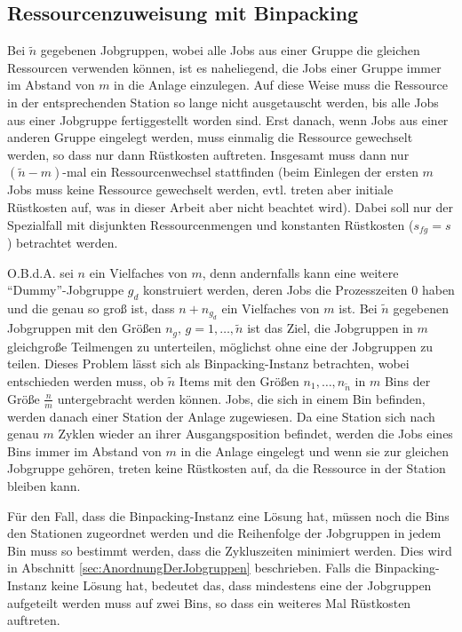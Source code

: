 \documentclass{scrreprt}
\begin{document}

\subsection{Ressourcenzuweisung mit Binpacking}
\label{subsec:RessourcenzuweisungMitBinpacking}
Bei $\tilde{n}$ gegebenen Jobgruppen, wobei alle Jobs aus einer Gruppe die gleichen Ressourcen verwenden können,
ist es naheliegend, die Jobs einer Gruppe immer im Abstand von $m$ in die Anlage einzulegen.
Auf diese Weise muss die Ressource in der entsprechenden Station so lange nicht ausgetauscht werden,
bis alle Jobs aus einer Jobgruppe fertiggestellt worden sind.
Erst danach, wenn Jobs aus einer anderen Gruppe eingelegt werden, muss einmalig die Ressource gewechselt werden,
so dass nur dann Rüstkosten auftreten.
Insgesamt muss dann nur $(\tilde{n}-m)$-mal ein Ressourcenwechsel stattfinden 
(beim Einlegen der ersten $m$ Jobs muss keine Ressource gewechselt werden, evtl. treten aber initiale Rüstkosten auf, was in dieser Arbeit aber nicht beachtet wird).
Dabei soll nur der Spezialfall mit disjunkten Ressourcenmengen und konstanten Rüstkosten ($s_{fg}=s$) betrachtet werden.

O.B.d.A. sei $n$ ein Vielfaches von $m$, denn andernfalls kann eine weitere "`Dummy"'-Jobgruppe $g_d$ konstruiert werden,
deren Jobs die Prozesszeiten $0$ haben und die genau so groß ist, dass $n+n_{g_d}$ ein Vielfaches von $m$ ist.
Bei $\tilde{n}$ gegebenen Jobgruppen mit den Größen $n_g, \, g=1,\ldots,\tilde{n}$ ist das Ziel,
die Jobgruppen in $m$ gleichgroße Teilmengen zu unterteilen, möglichst ohne eine der Jobgruppen zu teilen.
Dieses Problem lässt sich als Binpacking-Instanz betrachten, wobei entschieden werden muss, ob $\tilde{n}$ Items 
mit den Größen $n_1,\ldots,n_{\tilde{n}}$ in $m$ Bins der Größe $\frac{n}{m}$ untergebracht werden können.
Jobs, die sich in einem Bin befinden, werden danach einer Station der Anlage zugewiesen.
Da eine Station sich nach genau $m$ Zyklen wieder an ihrer Ausgangsposition befindet,
werden die Jobs eines Bins immer im Abstand von $m$ in die Anlage eingelegt und wenn sie zur gleichen Jobgruppe gehören, treten keine Rüstkosten auf,
da die Ressource in der Station bleiben kann.

Für den Fall, dass die Binpacking-Instanz eine Lösung hat, müssen noch die Bins den Stationen zugeordnet werden und die Reihenfolge
der Jobgruppen in jedem Bin muss so bestimmt werden, dass die Zykluszeiten minimiert werden.
Dies wird in Abschnitt \ref{sec:AnordnungDerJobgruppen} beschrieben.
Falls die Binpacking-Instanz keine Lösung hat, bedeutet das, dass mindestens eine der Jobgruppen aufgeteilt werden muss auf zwei Bins,
so dass ein weiteres Mal Rüstkosten auftreten.
\end{document}
